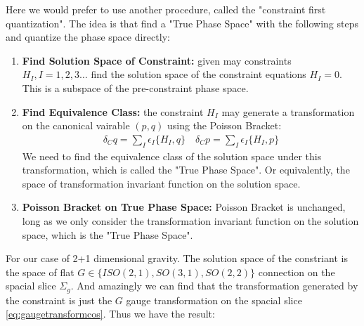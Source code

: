Here we would prefer to use another procedure, called the "constraint
first quantization". The idea is that find a "True Phase Space" with
the following steps and quantize the phase space directly:
\begin{enumerate}
  \item \textbf{Find Solution Space of Constraint: } given may
    constraints $ H_I, I = 1,2,3 \dots $ find the solution space of
    the constraint equations $ H_I = 0 $. This is a subspace of the
    pre-constraint phase space.
  \item \textbf{Find Equivalence Class: } the constraint $ H_I $
    may generate a transformation on the canonical vairable $ (p,q) $
    using the Poisson Bracket:
    \begin{align}
      \delta_C q = \displaystyle\sum_{I} \epsilon_I \{ H_I, q \}
      \quad \delta_C p = \displaystyle\sum_{I} \epsilon_I \{ H_I, p \}
    \end{align}
    We need to find the equivalence class of the solution space under
    this transformation, which is called the "True Phase Space". Or
    equivalently, the space of transformation invariant function on
    the solution space.
  \item \textbf{Poisson Bracket on True Phase Space:} Poisson Bracket
    is unchanged, long as we only consider the transformation
    invariant function on the solution space, which is the "True Phase Space".
\end{enumerate}
For our case of 2+1 dimensional gravity. The solution space of the
constriant is the space of flat $ G \in \{ ISO(2,1), SO(3,1),
SO(2,2)\} $ connection on the spacial slice $ \Sigma_g $.
And amazingly we can find that the transformation generated by the
constraint is just the $ G $ gauge transformation on the spacial
slice \cref{eq:gaugetransformcos}.
Thus we have the result:

